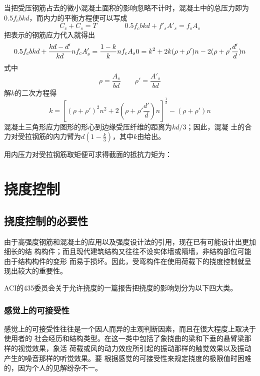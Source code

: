 \documentclass[12pt,a4paper]{book}
\begin{document}
当把受压钢筋占去的微小混凝土面积的影响忽略不计时，混凝土中的总压力即为
$0.5f_cbkd$，而内力的平衡方程便可以写成
\begin{equation}
  \label{eq:29} C_c+C_s=T\qquad\qquad 0.5f_cbkd+f'_sA'_s=f_sA_s
\end{equation}
把表示的钢筋应力代入就得出
\begin{equation*} 
0.5f_cbkd+\frac{kd-d'}{kd}nf_cA'_s=\frac{1-k}{k}nf_cA_s\\
0=k^2+2k(\rho+\rho')n-2(\rho+\rho'\frac{d'}{d})n
\end{equation*}
式中
\begin{equation*} \rho=\frac{A_s}{bd}\qquad \rho'=\frac{A'_s}{bd}
\end{equation*}解$k$的二次方程得
\begin{equation}
  \label{eq:30}
k=[(\rho+\rho')^2n^2+2(\rho+\rho'\frac{d'}{d})n]^{\frac{1}{2}}-(\rho+\rho')n
\end{equation}混凝土三角形应力图形的形心到边缘受压纤维的距离为$kd/3$；因此，混凝
土的合力对受拉钢筋的内力臂为$d(1-\frac{k}{3})$，其中$k$由给出。

用内压力对受拉钢筋取矩便可求得截面的抵抗力矩为：

\section{挠度控制}

\subsection{挠度控制的必要性}

由于高强度钢筋和混凝土的应用以及强度设计法的引用，现在已有可能设计出更加细长的结
构构件；而且现代建筑结构又往往不设实体墙或隔墙，非结构部位可能由于结构构件的变形
而易于损坏。因此，受弯构件在使用荷载下的挠度控制就呈现出较大的重要性。

ACI的435委员会关于允许挠度的一篇报告把挠度的影响划分为以下四大类。

\subsubsection{感觉上的可接受性}

感觉上的可接受性往往是一个因人而异的主观判断因素，而且在很大程度上取决于使用者的
社会经历和结构类型。在这一类中包括了象挠曲的梁和下垂的悬臂梁那样的视觉效果，象活
荷载或风的动力效应所引起的振动那样的触觉效果以及振动产生的噪音那样的听觉效果。要
根据感觉的可接受性来规定挠度的极限值时困难的，因为个人的见解纷杂不一。
\end{document}
